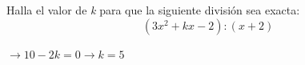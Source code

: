 \documentclass[addpoints,spanish, 12pt,a4paper]{exam}
\begin{document}
\begin{questions}


\question[1] Halla el valor de \emph{k} para que la siguiente división sea exacta: $$(3x^2+kx-2):(x+2)$$
\begin{solution} $\to 10-2k=0 \to k=5 $ \end{solution}




\addpoints





\end{questions}
\end{document}
